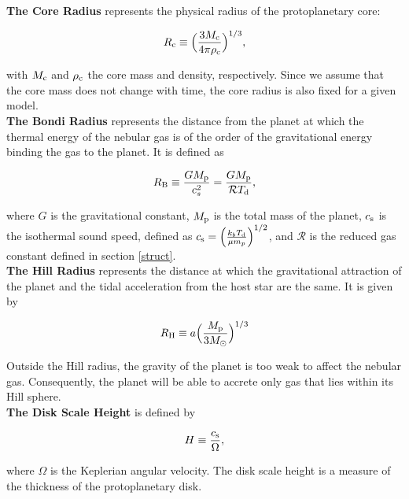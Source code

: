 \documentclass[apj]{emulateapj}
\newcommand{\co}{_{\rm c}}
\newcommand{\di}{_{\rm d}}
\begin{document}
\textbf{The Core Radius} represents the physical radius of the protoplanetary core:

\begin{equation}
\label{eq:rc}
R\co \equiv \Big(\frac{3 M\co}{4 \pi \rho\co}\Big)^{1/3},
\end{equation}

\noindent with $M\co$ and $\rho\co$ the core mass and density, respectively. Since we assume that the core mass does not change with time, the core radius is also fixed for a given model. \\

\textbf{The Bondi Radius} represents the distance from the planet at which the thermal energy of the nebular gas is of the order of the gravitational energy binding the gas to the planet. It is defined as

\begin{equation}
\label{eq:RB}
R_{\rm B} \equiv \frac{G M_{\rm p}}{c_s^2}=\frac{G M_{\rm p}}{\mathcal{R} T\di},
\end{equation}

\noindent where $G$ is the gravitational constant, $M_{\rm p}$ is the total mass of the planet, $c_{\rm s}$ is the isothermal sound speed, defined as $c_{\rm s}=\Big(\frac{k_b T\di}{\mu m_p}\Big)^{1/2}$, and $\mathcal{R}$ is the reduced gas constant defined in section \ref{struct}.\\


\textbf{The Hill Radius} represents the distance at which the gravitational attraction of the planet and the tidal acceleration from the host star are the same. It is given by

\begin{equation}
\label{eq:RHill}
R_{\rm H} \equiv a \Big(\frac{M_{\rm p}}{3 M_{\odot}}\Big)^{1/3}
\end{equation}

\noindent Outside the Hill radius, the gravity of the planet is too weak to affect the nebular gas. Consequently, the planet will be able to accrete only gas that lies within its Hill sphere. \\

\textbf{The Disk Scale Height} is defined by

\begin{equation}
\label{eq:H}
H \equiv \frac{c_{\rm s}}{\Omega},
\end{equation}

\noindent where $\Omega$ is the Keplerian angular velocity. The disk scale height is a measure of the thickness of the protoplanetary disk. %
\end{document}
